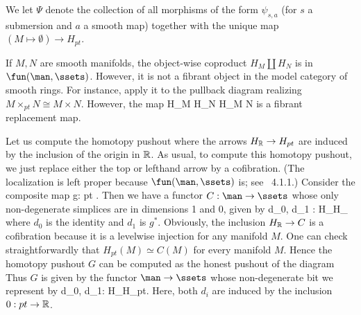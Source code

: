 \begin{defn}
We let $\Psi$ denote the collection of all morphisms of the form $\psi_{s,a}$ (for $s$ a submersion and $a$ a smooth map) together with the unique map $(M \mapsto \emptyset) \to H_{pt}$.
\end{defn}



\begin{example}
If $M, N$ are smooth manifolds, the object-wise coproduct $H_M \coprod H_N$ is in $\fun(\man,\ssets)$. However, it is not a fibrant object in the model category of smooth rings. For instance, apply it to the pullback diagram realizing $M \times_{pt} N \cong M \times N$. However, the map
	\eqnn
		H_M \coprod H_N \to H_{M \times N}
	\eqnd
is a fibrant replacement map. 
\end{example}

\begin{example}
Let us compute the homotopy pushout
	\eqnn
	\eqnd
where the arrows $H_\mathbb R \to H_{pt}$ are induced by the inclusion of the origin in $\mathbb R$. As usual, to compute this homotopy pushout, we just replace either the top or lefthand arrow by a cofibration. (The localization is left proper because $\fun(\man,\ssets)$ is; see~\cite{hirschhorn} 4.1.1.) Consider the composite map
	\eqnn
		g: \RR \to pt  \RR.
	\eqnd
Then we have a functor $C: \man \to \ssets$ whose only non-degenerate simplices are in dimensions 1 and 0, given by
	\eqnn
	d_0, d_1 : H_\RR \to H_\RR
	\eqnd
where $d_0$ is the identity and $d_1$ is $g^*$. Obviously, the inclusion $H_\mathbb R \to C$ is a cofibration because it is a levelwise injection for any manifold $M$. One can check straightforwardly that $H_{pt}(M) \simeq C(M)$ for every manifold $M$. Hence the homotopy pushout $G$ can be computed as the honest pushout of the diagram
	\eqnn
	\eqnd
Thus $G$ is given by the functor $\man \to \ssets$ whose non-degenerate bit we represent by
	\eqnn
	d_0, d_1: H_\RR \to H_{pt}.
	\eqnd
Here, both $d_i$ are induced by the inclusion $0: pt \to \mathbb R$. 

\end{example}



